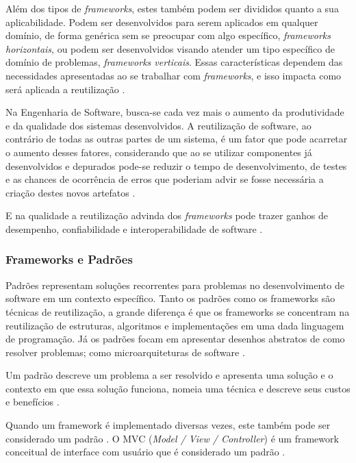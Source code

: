 Além dos tipos de \textit{frameworks}, estes também podem ser divididos quanto a sua aplicabilidade. Podem ser desenvolvidos para serem aplicados em qualquer domínio, de forma genérica sem se preocupar com algo específico, \textit{frameworks horizontais}, ou podem ser desenvolvidos visando atender um tipo específico de domínio de problemas, \textit{frameworks verticais}. Essas características dependem das necessidades apresentadas ao se trabalhar com \textit{frameworks}, e isso impacta como será aplicada a reutilização \cite{Kroth:2000}.

Na Engenharia de Software, busca-se cada vez mais o aumento da produtividade e da qualidade dos sistemas desenvolvidos. A reutilização de software, ao contrário de todas as outras partes de um sistema, é um fator que pode acarretar o aumento desses fatores, considerando que ao se utilizar componentes já desenvolvidos e depurados pode-se reduzir o tempo de desenvolvimento, de testes e as chances de ocorrência de erros que poderiam advir se fosse necessária a criação destes novos artefatos \cite{Silva:2000}.

E na qualidade a reutilização advinda dos \textit{frameworks} pode trazer ganhos de desempenho, confiabilidade e interoperabilidade de software \cite{Fayad:Schimidt:1997}.

\subsubsection{Frameworks e Padrões}

Padrões representam soluções recorrentes para problemas no desenvolvimento de software em um contexto específico. Tanto os padrões como os frameworks são técnicas de reutilização, a grande diferença é que os frameworks 	se concentram na reutilização de estruturas, algoritmos e implementações em uma dada linguagem de programação. Já os padrões focam em apresentar desenhos abstratos de como resolver problemas; como microarquiteturas de software \cite{Fayad:Schimidt:1997}.

Um padrão descreve um problema a ser resolvido e apresenta uma solução e o contexto em que essa solução funciona, nomeia uma técnica e descreve seus custos e benefícios \cite{Johnson:1997}.

Quando um framework é implementado diversas vezes, este também pode ser considerado um padrão \cite{Johnson:1997}. O MVC (\textit{Model / View / Controller}) é um framework conceitual de interface com usuário que é considerado um padrão \cite{Almeida:2006}.

